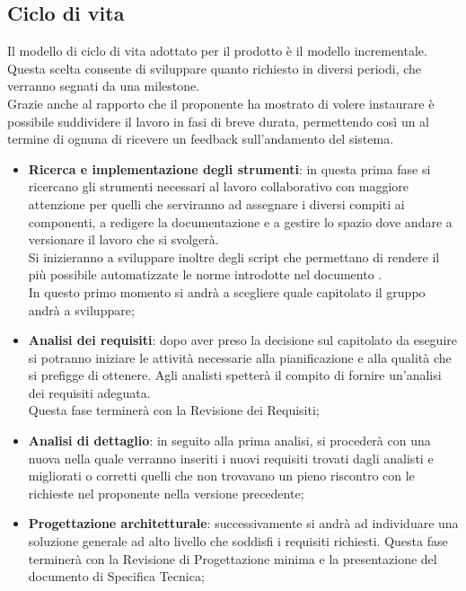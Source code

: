 	\subsection{Ciclo di vita}
	Il modello di ciclo di vita adottato per il prodotto è il modello incrementale. \\
	Questa scelta consente di sviluppare quanto richiesto in diversi periodi, che verranno segnati da una milestone. \\
	Grazie anche al rapporto che il proponente ha mostrato di volere instaurare è possibile suddividere il lavoro in fasi di breve durata, permettendo così un al termine di ognuna di ricevere un feedback sull'andamento del sistema.
		\begin{itemize}
			\item \textbf{Ricerca e implementazione degli strumenti}: in questa prima fase si ricercano gli strumenti necessari al lavoro collaborativo con maggiore attenzione per quelli che serviranno ad assegnare i diversi compiti ai componenti, a redigere la documentazione e a gestire lo spazio dove andare a versionare il lavoro che si svolgerà. \\
			Si inizieranno a sviluppare inoltre degli script che permettano di rendere il più possibile automatizzate le norme introdotte nel documento \docNameVersionNdP. \\
			In questo primo momento si andrà a scegliere quale capitolato il gruppo andrà a sviluppare;

			\item \textbf{Analisi dei requisiti}: dopo aver preso la decisione sul capitolato da eseguire si potranno iniziare le attività necessarie alla pianificazione e alla qualità che si prefigge di ottenere.
			Agli analisti spetterà il compito di fornire un'analisi dei requisiti adeguata.\\
			Questa fase terminerà con la Revisione dei Requisiti;

			\item \textbf{Analisi di dettaglio}: in seguito alla prima analisi, si procederà con una nuova nella quale verranno inseriti i nuovi requisiti trovati dagli analisti e migliorati o corretti quelli che non trovavano un pieno riscontro con le richieste nel proponente nella versione precedente;
			
			\item \textbf{Progettazione architetturale}: successivamente si andrà ad individuare una soluzione generale ad alto livello che soddisfi i requisiti richiesti. Questa fase terminerà con la Revisione di Progettazione minima e la presentazione del documento di Specifica Tecnica;


\end{itemize}
